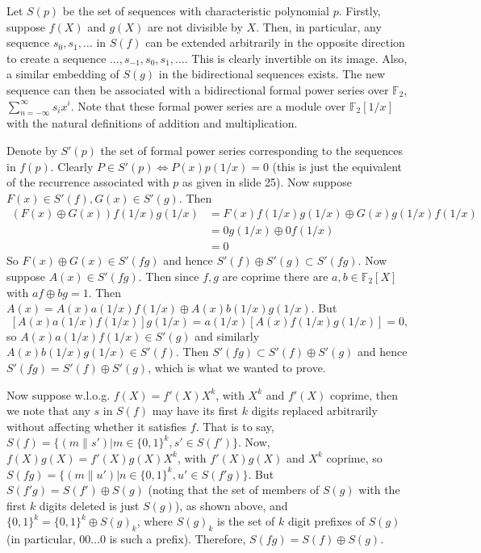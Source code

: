 Let $S(p)$ be the set of sequences with characteristic polynomial $p$. Firstly, suppose
$f(X)$ and $g(X)$ are not divisible by $X$. Then, in particular,
any sequence $s_0,s_1,\dots$ in $S(f)$ can be extended arbitrarily in the opposite
direction to create a sequence $\dots,s_{-1},s_0,s_1,\dots$. This is clearly
invertible on its image. Also, a similar embedding of $S(g)$ in the bidirectional
sequences exists.
The new sequence can then be associated with a bidirectional formal power series over
$\mathbb{F}_2$, $\sum_{n=-\infty}^\infty s_ix^i$. Note that these formal power
series are a module over $\mathbb{F}_2[1/x]$ with the natural definitions of addition
and multiplication. 

Denote by $S'(p)$ the set of formal power series corresponding
to the sequences in $f(p)$. Clearly $P \in S'(p) \Leftrightarrow P(x)p(1/x)=0$ (this
is just the equivalent of the recurrence associated with $p$ as given in \cite{slides}
slide 25). Now suppose $F(x)\in S'(f),G(x)\in S'(g)$. Then 
\begin{align*}
(F(x) \oplus G(x))f(1/x)g(1/x) &= F(x)f(1/x)g(1/x)\oplus G(x)g(1/x)f(1/x) \\
&= 0g(1/x)\oplus 0f(1/x) \\
&= 0
\end{align*}
So $F(x) \oplus G(x) \in S'(fg)$ and hence $S'(f)\oplus S'(g) \subset S'(fg)$.
Now suppose $A(x) \in S'(fg)$. Then since $f,g$ are
coprime there are $a,b \in \mathbb{F}_2[X]$ with $af\oplus bg=1$. Then
$A(x)=A(x)a(1/x)f(1/x)\oplus A(x)b(1/x)g(1/x)$. But 
\[[A(x)a(1/x)f(1/x)]g(1/x)=a(1/x)[A(x)f(1/x)g(1/x)]=0,\] so
$A(x)a(1/x)f(1/x) \in S'(g)$ and similarly
$A(x)b(1/x)g(1/x) \in S'(f)$. Then $S'(fg) \subset S'(f)\oplus S'(g)$ and hence
$S'(fg) = S'(f) \oplus S'(g)$, which is what we wanted to prove.

Now suppose w.l.o.g. $f(X)=f'(X)X^k$, with $X^k$ and $f'(X)$ coprime,
then we note that any $s$ in $S(f)$ may have its 
first $k$ digits replaced arbitrarily without affecting whether it satisfies $f$.
That is to say, $S(f)=\{(m\|s') |m\in\{0,1\}^k, s' \in S(f')  \}$.
Now, $f(X)g(X)=f'(X)g(X)X^k$, with $f'(X)g(X)$ and $X^k$ coprime, so 
$S(fg)=\{(m\|u') |n\in\{0,1\}^k, u' \in S(f'g)\}$. But $S(f'g)=S(f')\oplus S(g)$ (noting
that the set of members of $S(g)$ with the first $k$ digits deleted is just $S(g)$),
as shown above, and $\{0,1\}^k = \{0,1\}^k \oplus S(g)_k$, where $S(g)_k$ is the
set of $k$ digit prefixes of $S(g)$ (in particular, $00\dots0$ is such a prefix).
Therefore, $S(fg)=S(f)\oplus S(g)$.
